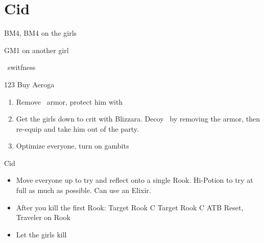 \chapter{Cid}


\begin{liscense}
BM4, BM4 on the girls

GM1 on another girl

\vaan\ switfness
\end{liscense}
\begin{gambit}
\begin{itemize}
\end{itemize}
\end{gambit}
\begin{shop}{123}
Buy Aeroga
\end{shop}
\begin{enumerate}
\item Remove \vaan\ armor, protect him with \penelo
\item Get the girls down to crit with Blizzara. Decoy \vaan\ by removing the armor, then re-equip and take him out of the party.
\item Optimize everyone, turn on gambits
\end{enumerate}
\begin{battle}{Cid}
\begin{itemize}
\item Move everyone up to try and reflect onto a single Rook.
\vaanf Hi-Potion to try at full as much as possible. Can use an Elixir.
\item After you kill the first Rook:
\ashef Target Rook C
\penelof Target Rook C
\vaanf ATB Reset, Traveler on Rook
\item Let the girls kill
\end{itemize}
\end{battle}